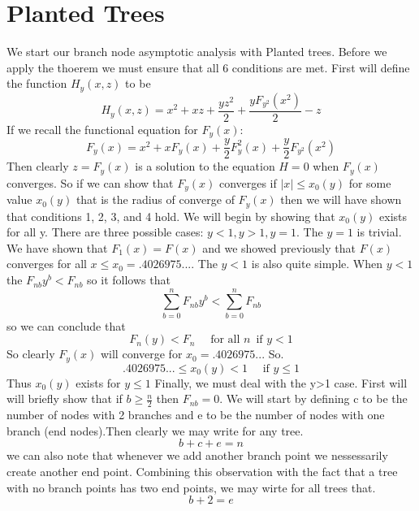 \documentclass{article}
\begin{document}
\section{Planted Trees}
We start our branch node asymptotic analysis with Planted trees. Before we apply the thoerem we must ensure that all 6 conditions are met. First will define the function \(H_y(x,z)\) to be
\begin{equation}
H_y(x,z)=x^2+xz+\frac{yz^2}{2}+\frac{yF_{y^2}(x^2)}{2}-z
\end{equation}
If we recall the functional equation for \(F_y(x)\):
\begin{equation}
F_y(x)=x^2+ xF_y(x)+\frac{y}{2}F_y^2(x)+\frac{y}{2}F_{y^2}(x^2)
\end{equation}
Then clearly \(z=F_y(x)\) is a solution to the equation \(H=0\) when \(F_y(x)\) converges. So if we can show that \(F_y(x)\) converges if \(|x| \leq x_0(y)\) for some value \(x_0(y)\) that is the radius of converge of \(F_y(x)\) then we will have shown that conditions 1, 2, 3, and 4 hold. 
	We will begin by showing that \(x_0(y)\) exists for all y. There are three possible cases: \(y<1 , y>1, y=1\). The \(y=1\) is trivial. We have shown that \(F_1(x)=F(x)\) and we showed previously that \(F(x)\) converges for all \(x \leq x_0=.4026975...\). The \(y<1\) is also quite simple. When \(y<1\) the \(F_{nb}y^b < F_{nb}\) so it follows that 
\[\sum_{b=0}^n F_{nb}y^b<\sum_{b=0}^n F_{nb}\] so we can conclude that 
\begin{equation}
F_n(y)<F_n \quad \text{ for all } n \, \text{ if } y<1
\end{equation}
So clearly \(F_y(x)\) will converge for \(x_0=.4026975...\) So. 
\begin{equation}
.4026975...\leq x_0(y) < 1 \quad \text{ if } y \leq 1
\end{equation} 
Thus \(x_0(y)\) exists for \(y \leq 1\)
Finally, we must deal with the y>1 case. First will will briefly show that if \(b \geq \frac{n}{2}\) then \(F_{nb}=0\). We will start by defining c to be the number of nodes with 2 branches and e to be the number of nodes with one branch (end nodes).Then clearly we may write for any tree.
\begin{equation}
b + c + e = n
\end{equation}
we can also note that whenever we add another branch point we nessessarily create another end point. Combining this observation with the fact that a tree with no branch points has two end points, we may wirte for all trees that. 
\begin{equation}
b + 2= e
\end{equation}
\end{document}
